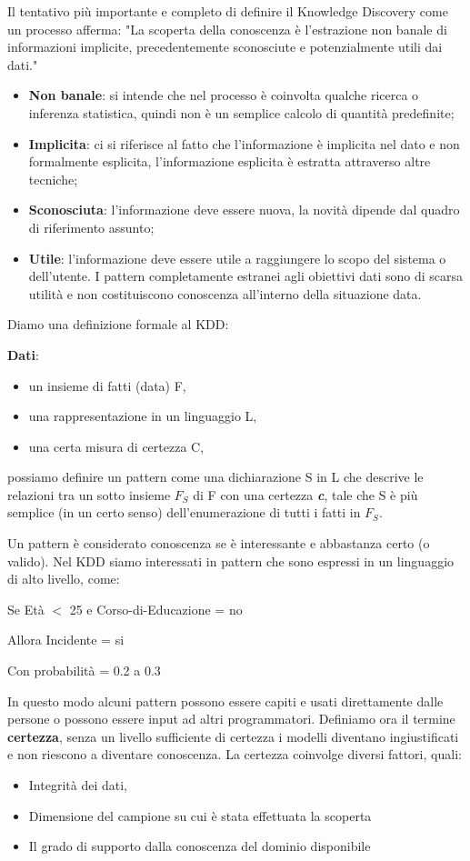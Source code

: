 \documentclass[a4paper]{extarticle}
\begin{document}
Il tentativo più importante e completo di definire il Knowledge Discovery come un processo afferma: "La scoperta della conoscenza è l'estrazione non banale di informazioni implicite, precedentemente sconosciute e potenzialmente utili dai dati."
\begin{itemize}
    \item \textbf{Non banale}: si intende che nel processo è coinvolta qualche ricerca o inferenza statistica, quindi non è un semplice calcolo di quantità predefinite;
    \item \textbf{Implicita}: ci si riferisce al fatto che l'informazione è implicita nel dato e non formalmente esplicita, l'informazione esplicita è estratta attraverso altre tecniche;
    \item \textbf{Sconosciuta}: l'informazione deve essere nuova, la novità dipende dal quadro di riferimento assunto;
    \item \textbf{Utile}: l'informazione deve essere utile a raggiungere lo scopo del sistema o dell'utente. I pattern completamente estranei agli obiettivi dati sono di scarsa utilità e non costituiscono conoscenza all'interno della situazione data.
\end{itemize}

Diamo una definizione formale al KDD:

\textbf{Dati}:
\begin{itemize}
	\item un insieme di fatti (data) F,
	\item una rappresentazione in un linguaggio L,
	\item una certa misura di certezza C,
\end{itemize}
possiamo definire un pattern come una dichiarazione S in L che descrive le relazioni tra un sotto insieme $F_{S}$ di F con una certezza \textbf{\textit{c}}, tale che S è più semplice (in un certo senso) dell'enumerazione di tutti i fatti in $F_S$.

Un pattern è considerato conoscenza se è interessante e abbastanza
certo (o valido). Nel KDD siamo interessati in pattern che sono espressi in un linguaggio di alto livello, come:
\newpage
\begin{center}
Se Età $<$ 25 e Corso-di-Educazione = no

Allora Incidente = si

Con probabilità = 0.2 a 0.3
\end{center}
In questo modo alcuni pattern possono essere capiti e usati direttamente dalle persone o possono essere input ad altri programmatori.
Definiamo ora il termine \textbf{certezza}, senza un livello sufficiente di certezza i modelli diventano ingiustificati e non riescono a diventare conoscenza. La certezza coinvolge diversi fattori, quali: 
\begin{itemize}
	\item Integrità dei dati,
	\item Dimensione del campione su cui è stata effettuata la scoperta 
	\item Il grado di supporto dalla conoscenza del dominio disponibile
\end{itemize}
\end{document}
